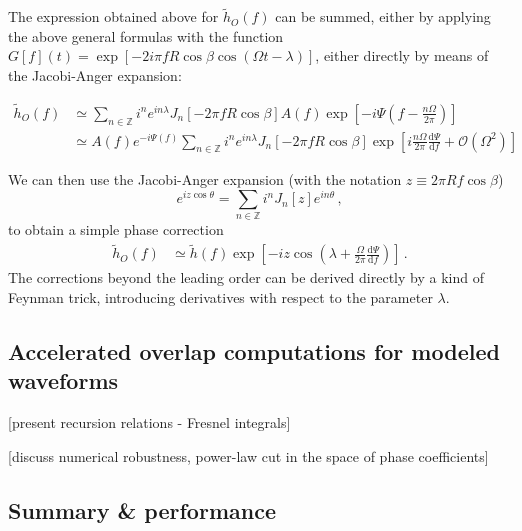 \documentclass[aps,showpacs,twocolumn,prd,superscriptaddress,nofootinbib]{revtex4}
\newcommand{\be}{\begin{equation}}
\newcommand{\ee}{\end{equation}}
\newcommand\ud{{\mathrm{d}}}
\newcommand\calO{{\mathcal{O}}}
\newcommand{\nn}{\nonumber}
\begin{document}
The expression obtained above for $\tilde{h}_{O}\left(f\right)$ can be summed, either by applying the above general formulas with the function $G[f](t) = \exp\left[ -2i \pi f R \cos \beta \cos (\Omega t - \lambda) \right]$, either directly by means of the Jacobi-Anger expansion:
%
\begin{widetext}
\begin{align}
	\tilde{h}_{O}\left(f\right) &\simeq \sum\limits_{n\in \mathbb{Z}} i^{n}e^{i n \lambda} J_{n}\left[ -2\pi f R \cos \beta \right] A(f) \exp\left[ -i \Psi \left(f-\frac{n\Omega}{2\pi}\right) \right] \nn \\
	&\simeq A(f) e^{-i \Psi \left(f\right)} \sum\limits_{n\in \mathbb{Z}} i^{n}e^{i n \lambda} J_{n}\left[ -2\pi f R \cos \beta \right] \exp\left[ i \frac{n\Omega}{2\pi} \frac{\ud \Psi}{\ud f} + \calO(\Omega^{2})  \right]
\end{align}
\end{widetext}
%
We can then use the Jacobi-Anger expansion (with the notation $z\equiv 2\pi R f \cos\beta$)
%
\be
	e^{i z \cos \theta}= \sum\limits_{n\in \mathbb{Z}} i^{n}J_{n}[z]e^{i n \theta} \,,
\ee
%
to obtain a simple phase correction
%
\begin{subequations}
\begin{align}
	\tilde{h}_{O}\left(f\right) &\simeq \tilde{h}(f) \exp\left[ -iz \cos\left( \lambda + \frac{\Omega}{2\pi} \frac{\ud \Psi}{\ud f} \right) \right]\,.
\end{align}
\end{subequations}
%
The corrections beyond the leading order can be derived directly by a kind of Feynman trick, introducing derivatives with respect to the parameter $\lambda$.


\subsection{Accelerated overlap computations for modeled waveforms}
\label{subsec:overlaps}

[present recursion relations - Fresnel integrals]

[discuss numerical robustness, power-law cut in the space of phase coefficients]


\subsection{Summary \& performance}
\label{subsec:performance}
\end{document}
